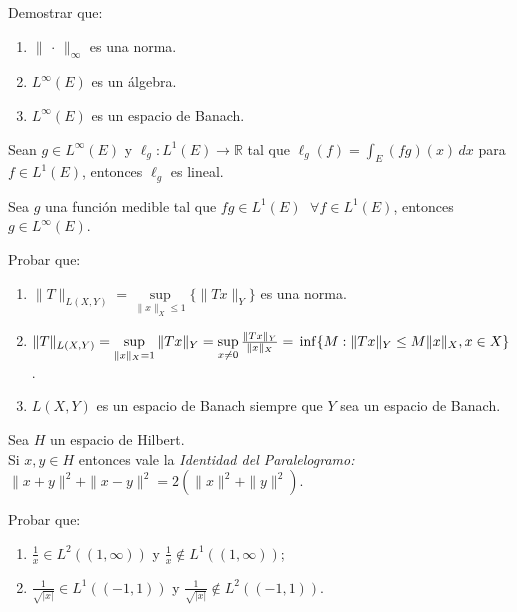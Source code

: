 \documentclass{book}
\newcommand{\rr}{\mathbb{R}}
\begin{document}
\begin{ejer}{} Demostrar que:
	\begin{enumerate}
\item $\|\, \cdot\,\|_{\infty}$ es una norma.
\item $L^{\infty}(E)$ es un álgebra.
\item $L^{\infty}(E)$ es un espacio de Banach.  
	\end{enumerate}
	\end{ejer}



\begin{ejer}{} Sean $g\in L^{\infty}(E)$ y \;\;$\ell_g:L^1(E)\rightarrow \rr$\;\; 
tal que \;\;$\ell_g(f)=\int_E (fg)(x)\,dx$\;\; para
\\ 
$f \in L^1(E)$, entonces
$\ell_g$ es lineal.
\end{ejer}


\begin{ejer}{} Sea $g$ una función medible tal que $fg\in L^1(E)$ $\;\forall f \in L^1(E)$, entonces $g \in L^{\infty}(E)$.
\end{ejer}




\begin{ejer}{} Probar que: 
		\begin{enumerate}
	\item 
$\|T\|_{L(X,Y)}=\sup\limits_{\|x\|_{X}\leq 1}\{\|Tx\|_{Y}\}$
es una norma.
	\item 
 $\|T\|_{L(X,Y)}=\sup\limits_{\|x\|_{X}=1}\|Tx\|_{Y}=
\sup\limits_{x \not =0}\frac{\|Tx\|_{Y}}{\|x\|_{X}}=
\\
\inf\{M:\|Tx\|_{Y}\leq M \|x\|_{X}, x\in X\}$.
\item $L(X,Y)$ es un espacio de Banach siempre que $Y$ sea un espacio de Banach.
		\end{enumerate}
\end{ejer}
		
		
\begin{ejer}{} 
Sea $H$ un espacio de Hilbert.
 \\
 Si $x,y\in H$ entonces vale la {\it{Identidad del Paralelogramo:}}
\\
 $\|x+y\|^2+\|x-y\|^2=2(\|x\|^2+\|y\|^2). $
 \end{ejer}
 
\begin{ejer}{}
 Probar que:
	\begin{enumerate}
  \item $\frac{1}{x}\in L^2((1,\infty))$ y $\frac{1}{x}\not \in L^1((1,\infty))$;
  \item $\frac{1}{\sqrt{|x|}}\in L^1((-1,1))$ y $\frac{1}{\sqrt{|x|}}\not \in L^2((-1,1))$.
	\end{enumerate}
\end{ejer}
\end{document}
